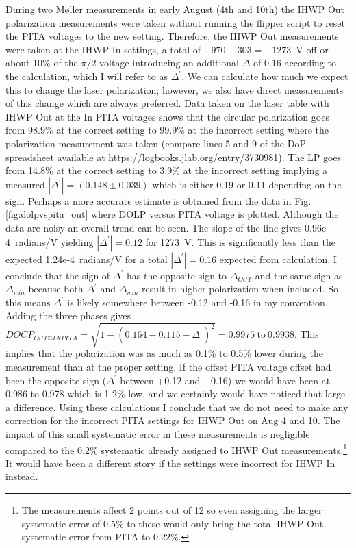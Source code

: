 \documentclass[12pt]{article}
\begin{document}
During two M\o ller measurements in early August (4th and 10th) the IHWP Out polarization measurements were taken without running the flipper script to reset the PITA voltages to the new setting. Therefore, the IHWP Out measurements were taken at the IHWP In settings, a total of $-970-303=-1273$~V off or about 10\% of the $\pi/2$ voltage introducing an additional $\Delta$ of 0.16 according to the calculation, which I will refer to as $\Delta^{\prime}$. We can calculate how much we expect this to change the laser polarization; however, we also have direct measurements of this change which are always preferred. Data taken on the laser table with IHWP Out at the In PITA voltages shows that the circular polarization goes from 98.9\% at the correct setting to 99.9\% at the incorrect setting where the polarization measurement was taken (compare lines 5 and 9 of the DoP spreadsheet available at https://logbooks.jlab.org/entry/3730981). The LP  goes from 14.8\% at the correct setting to 3.9\% at the incorrect setting implying a measured $\left|\Delta^{\prime}\right|=(0.148\pm0.039)$ which is either 0.19 or 0.11 depending on the sign.  Perhaps a more accurate estimate is obtained from the data in Fig. \ref{fig:dolpvspita_out} where DOLP versus PITA voltage is plotted. Although the data are noisy an overall trend can be seen. The slope of the line gives 0.96e-4~radians/V yielding $\left|\Delta^\prime\right|=0.12$ for 1273~V. This is significantly less than the expected 1.24e-4~radians/V for a total $\left|\Delta^\prime\right|=0.16$ expected from calculation.   I conclude that the sign of $\Delta^{\prime}$ has the opposite sign to $\Delta_{OUT}$ and the same sign as $\Delta_{win}$ because both $\Delta^{\prime}$ and $\Delta_{win}$ result in higher polarization when included. So this means $\Delta^{\prime}$ is likely somewhere between -0.12  and -0.16 in my convention. Adding the three phases gives $DOCP_{OUT@IN PITA}=\sqrt{1-(0.164-0.115-\Delta^{\prime})^2}=0.9975~\textrm{to}~0.9938$. This implies that the polarization was as much as 0.1\% to 0.5\% lower during the measurement than at the proper setting. If the offset PITA voltage offset had been the opposite sign ($\Delta^{\prime}$ between +0.12 and +0.16) we would have been at 0.986 to 0.978 which is 1-2\% low, and we certainly would have noticed that large a difference. \textrm{Using these calculations I conclude that we do not need to make any correction for the incorrect PITA settings for IHWP Out on Aug 4 and 10. The impact of this small systematic error in these measurements is negligible compared to the 0.2\% systematic already assigned to IHWP Out measurements.}\footnote{The measurements affect 2 points out of 12 so even assigning the larger systematic error of 0.5\% to these would only bring the total IHWP Out systematic error from PITA to 0.22\%.} It would have been a different story if the settings were incorrect for IHWP In instead. 
\end{document}

